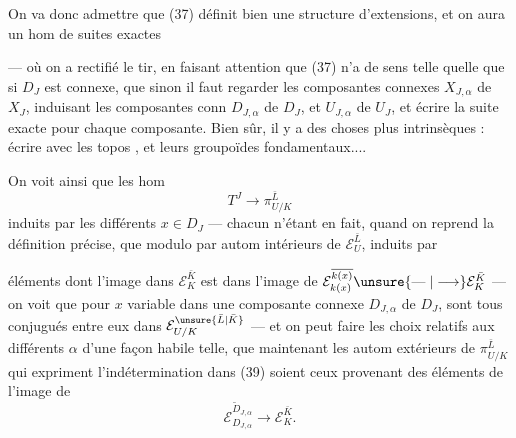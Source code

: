 

On va donc admettre que (37) définit bien une structure d'extensions, et on aura un hom de suites exactes


--- où on a rectifié le tir, en faisant attention que (37) n'a de sens telle quelle que si $D_J$ est connexe,  que sinon il faut regarder les composantes connexes $X_{J,\alpha}$ de $X_J$, induisant les composantes conn $D_{J,\alpha}$ de $D_J$, et $U_{J,\alpha}$ de $U_J$, et écrire la suite exacte pour chaque composante. Bien sûr, il y a des choses plus intrinsèques : écrire avec les topos , et leurs groupoïdes fondamentaux....

On voit ainsi que les hom
\[
\tag{39}
T^J\longrightarrow\pi_{U/K}^{\bar L}
\]
induits par les différents $x\in D_J$ --- chacun n'étant en fait, quand on reprend la définition précise, que  modulo   par autom intérieurs de $\mathcal E_U^{\bar L}$, induits par



éléments dont l'image dans $\mathcal E_K^{\bar K}$ est dans l'image de $\mathcal E_{k(x)}^{\overline{k(x)}}\unsure{\mathrel{\text{---}}|\longrightarrow}\mathcal E_K^{\bar K}$ --- on voit que pour $x$ variable dans une composante connexe $D_{J,\alpha}$ de $D_J$, sont tous conjugués entre eux dans $\mathcal E_{U/K}^{\unsure{\bar L|\bar K}}$ --- et on peut faire les choix relatifs aux différents $\alpha$ d'une façon habile telle, que maintenant les autom extérieurs de $\pi_{U/K}^{\bar L}$ qui expriment l'indétermination dans (39) soient ceux provenant des éléments de l'image de
\[
\mathcal E_{D_{J,\alpha}}^{\tilde D_{J,\alpha}}\longrightarrow\mathcal E_K^{\bar K}.
\]


